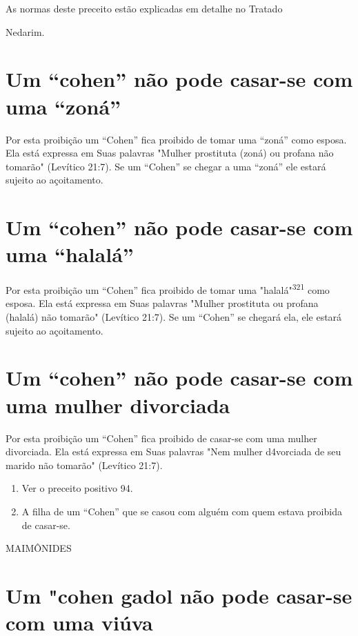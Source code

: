 As normas deste preceito estão explicadas em detalhe no Tratado


Nedarim.

\section{Um ``cohen'' não pode casar-se com uma ``zoná''}

Por esta proibição um ``Cohen'' fica proibido de tomar uma ``zoná'' como
esposa. Ela está expressa em Suas palavras "Mulher prostituta (zoná) ou
profana não tomarão" (Levítico 21:7). Se um ``Cohen'' se chegar a uma
``zoná'' ele estará sujeito ao açoitamento.

\section{Um ``cohen'' não pode casar-se com uma ``halalá''}

Por esta proibição um ``Cohen'' fica proibido de tomar uma
"hala­lá"\textsuperscript{321} como esposa. Ela está expressa em Suas
palavras "Mulher prostituta ou profana (halalá) não tomarão" (Levítico
21:7). Se um ``Cohen'' se chegará ela, ele estará sujeito ao açoitamento.

\section{Um ``cohen'' não pode casar-se com uma mulher divorciada}

Por esta proibição um ``Cohen'' fica proibido de casar-se com uma mulher
divorciada. Ela está expressa em Suas palavras "Nem mulher d4vorcia­da
de seu marido não tomarão" (Levítico 21:7).


\begin{enumerate}
\def\labelenumi{\arabic{enumi}.}
\setcounter{enumi}{319}
\item
 
 Ver o preceito positivo 94.
 
\item
 
 A filha de um ``Cohen'' que se casou com alguém com quem estava proibida
 de casar-se.
 
\end{enumerate}


MAIMÔNIDES


\section{Um "cohen gadol não pode casar-se com uma viúva}


